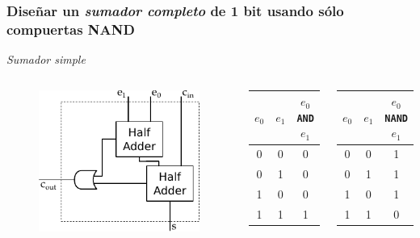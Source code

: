 \documentclass[mathserif,hyperref]{beamer}
\begin{document}
\begin{frame}[t]
\frametitle{\small Diseñar un \textit{sumador completo} de 1 bit usando sólo
compuertas NAND}
\textit{Sumador simple}
\begin{columns}[T]
  \begin{figure}[htp]
    \includegraphics[scale=0.6]{sumador-completo.pdf}
  \end{figure}
  \begin{center}\begin{tabular}{| c | c || c |}
    \hline
    $e_0$ & $e_1$ & $e_0$ \texttt{AND} $e_1$ \\ \hline
      0   &   0   &             0            \\
      0   &   1   &             0            \\
      1   &   0   &             0            \\
      1   &   1   &             1            \\
    \hline
  \end{tabular}\end{center}
  \pause
  \begin{center}\begin{tabular}{| c | c || c |}
    \hline
    $e_0$ & $e_1$ & $e_0$ \texttt{NAND} $e_1$ \\ \hline
      0   &   0   &              1            \\
      0   &   1   &              1            \\
      1   &   0   &              1            \\
      1   &   1   &              0            \\
    \hline
  \end{tabular}\end{center}
\end{columns}
\end{frame}
\end{document}
